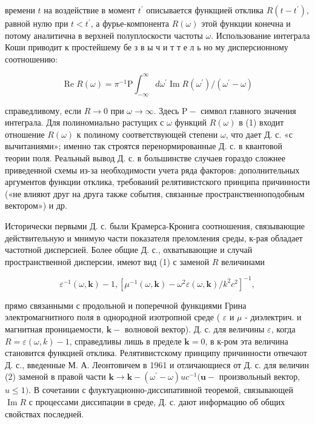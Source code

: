 \documentclass[10pt]{article}
\begin{document}
времени $t$ на воздействие в момент $t^{\prime}$ описывается функщией отклика $R\left(t-t^{\prime}\right)$, равной нулю при $t<t^{\prime}$, а фурье-компонента $R(\omega)$ этой функции конечна и потому аналитична в верхней полуплоскости частоты $\omega$. Использование интеграла Коши приводит к простейшему бе з в ы ч и т т е л ь но му дисперсионному соотношению:



\[

\operatorname{Re} R(\omega)=\pi^{-1} \mathrm{P} \int_{-\infty}^{\infty} d \omega^{\prime} \operatorname{Im} R\left(\omega^{\prime}\right) /\left(\omega^{\prime}-\omega\right)

\]



справедливому, если $R \rightarrow 0$ при $\omega \rightarrow \infty$. Здесь $\mathrm{P}-$ символ главного значения интеграла. Для полиномиально растущих с $\omega$ функций $R(\omega)$ в (1) входит отношение $R(\omega)$ к полиному соответствующей степени $\omega$, что дает Д. с. «с вычитаниями»; именно так строятся перенормированные Д. с. в квантовой теории поля. Реальный вывод Д. с. в большинстве случаев гораздо сложнее приведенной схемы из-за необходимости учета ряда факторов: дополнительных аргументов функции отклика, требований релятивистского принципа причинности («не влияют друг на друга также события, связанные пространственноподобным вектором») и др.



Исторически первыми Д. с. были Крамерса-Кронига соотношения, связывающие действительную и мнимую части показателя преломления среды, к-рая обладает частотной дисперсией. Более общие Д. с., охватывающие и случай пространственной дисперсии, имеют вид (1) с заменой $R$ величинами



\[

\varepsilon^{-1}(\omega, \boldsymbol{k})-1,\left[\mu^{-1}(\omega, \boldsymbol{k})-\omega^{2} \varepsilon(\omega, \boldsymbol{k}) / k^{2} c^{2}\right]^{-1},

\]



прямо связанными с продольной и поперечной функциями Грина электромагнитного поля в однородной изотропной среде ( $\varepsilon$ и $\mu$ - диэлектрич. и магнитная проницаемости, $\boldsymbol{k}-$ волновой вектор). Д. с. для величины $\varepsilon$, когда $R=\varepsilon(\omega, k)-1$, справедливы лишь в пределе $\boldsymbol{k}=0$, в к-ром эта величина становится функцией отклика. Релятивистскому принципу причинности отвечают Д. с., введенные М. А. Леонтовичем в 1961 и отличающиеся от Д. с. для величин (2) заменой в правой части $\boldsymbol{k} \rightarrow \boldsymbol{k}-\left(\omega^{\prime}-\omega\right) u c^{-1}(\boldsymbol{u}-$ произвольный вектор, $u \leqslant 1)$. В сочетании с флуктуационно-диссипативной теоремой, связывающей $\operatorname{Im} R$ с процессами диссипации в среде, Д. с. дают информацию об общих свойствах последней.
\end{document}
